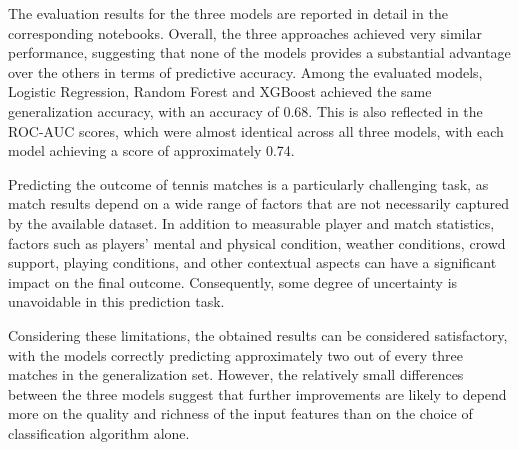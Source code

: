 \documentclass{article}
\begin{document}
The evaluation results for the three models are reported in detail in the corresponding 
notebooks. Overall, the three approaches achieved very similar performance, 
suggesting that none of the models 
provides a substantial advantage over the others in terms of predictive accuracy.
Among the evaluated models, Logistic Regression, Random Forest and XGBoost achieved 
the same 
generalization accuracy, with an accuracy of 0.68. This is also reflected in the 
ROC-AUC scores, which were almost identical across all 
three models, with each model achieving a score of approximately 0.74. 

Predicting the outcome of tennis matches is a particularly challenging task, as 
match results depend on a wide range of factors that are not necessarily captured 
by the available dataset. In addition to measurable player and match statistics, 
factors such as players' mental and physical condition, weather conditions, 
crowd support, playing conditions, and other contextual aspects can have a 
significant impact on the final outcome. 
Consequently, some degree of uncertainty is unavoidable in this prediction task.

Considering these limitations, the obtained results can be considered satisfactory, 
with the models correctly predicting approximately two out of every three matches 
in the generalization set. However, the relatively small differences between the 
three models suggest that further improvements are likely to depend more on the 
quality and richness of the input features than on the choice of classification 
algorithm alone.
\end{document}
